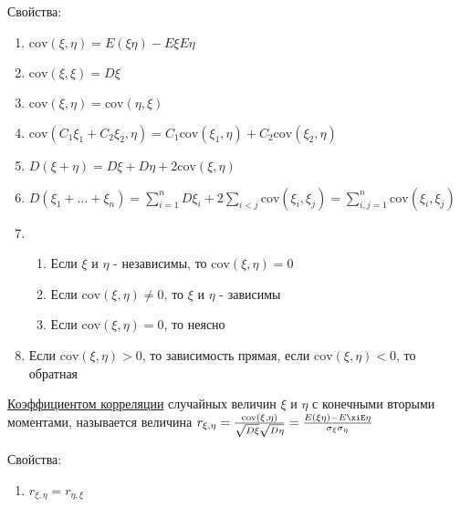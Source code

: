 \begin{enumerate}
    Свойства:

    \begin{enumerate}
        \item $\mathrm{cov} (\xi, \eta) = E(\xi\eta) - E\xi E\eta$

        \item $\mathrm{cov} (\xi, \xi) = D\xi$

        \item $\mathrm{cov}(\xi, \eta) = \mathrm{cov}(\eta, \xi)$

        \item $\mathrm{cov}(C_1 \xi_1 + C_2 \xi_2, \eta) = C_1 \mathrm{cov}(\xi_1, \eta) + C_2 \mathrm{cov}(\xi_2, \eta)$

        \item $D(\xi + \eta) = D\xi + D\eta + 2\mathrm{cov}(\xi, \eta)$

        \item $D(\xi_1 + \dots + \xi_n) = \sum_{i = 1}^n D\xi_i + 2\sum_{i < j} \mathrm{cov}(\xi_i, \xi_j) = \sum_{i, j = 1}^{n} \mathrm{cov}(\xi_i, \xi_j)$

        \item \begin{enumerate}
            \item Если $\xi$ и $\eta$ - независимы, то $\mathrm{cov}(\xi, \eta) = 0$

            \item Если $\mathrm{cov}(\xi, \eta) \neq 0$, то $\xi$ и $\eta$ - зависимы

            \item Если $\mathrm{cov}(\xi, \eta) = 0$, то неясно
        \end{enumerate}

        \item Если $\mathrm{cov}(\xi, \eta) > 0$, то зависимость прямая, если $\mathrm{cov}(\xi, \eta) < 0$, то обратная
    \end{enumerate}

    \hyperlink{correlation}{Коэффициентом корреляции} случайных величин $\xi$ и $\eta$ с конечными вторыми моментами,
    называется величина $r_{\xi,\eta} = \frac{\mathrm{cov(\xi, \eta)}}{\sqrt{D\xi} \sqrt{D\eta}} = \frac{E(\xi\eta) - E\xiE\eta}{\sigma_\xi \sigma_\eta}$
    
    Свойства:

    \begin{enumerate}
        \item $r_{\xi, \eta} = r_{\eta, \xi}$


\end{enumerate}
\end{enumerate}
